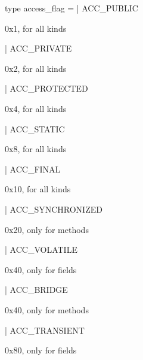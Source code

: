 \documentclass[11pt]{article}
\begin{document}
\label{type:Dex.access-underscoreflag}\begin{ocamldoccode}
type access_flag =
  | ACC_PUBLIC
\end{ocamldoccode}
\begin{ocamldoccomment}
0x1, for all kinds
\end{ocamldoccomment}
\begin{ocamldoccode}
  | ACC_PRIVATE
\end{ocamldoccode}
\begin{ocamldoccomment}
0x2, for all kinds
\end{ocamldoccomment}
\begin{ocamldoccode}
  | ACC_PROTECTED
\end{ocamldoccode}
\begin{ocamldoccomment}
0x4, for all kinds
\end{ocamldoccomment}
\begin{ocamldoccode}
  | ACC_STATIC
\end{ocamldoccode}
\begin{ocamldoccomment}
0x8, for all kinds
\end{ocamldoccomment}
\begin{ocamldoccode}
  | ACC_FINAL
\end{ocamldoccode}
\begin{ocamldoccomment}
0x10, for all kinds
\end{ocamldoccomment}
\begin{ocamldoccode}
  | ACC_SYNCHRONIZED
\end{ocamldoccode}
\begin{ocamldoccomment}
0x20, only for methods
\end{ocamldoccomment}
\begin{ocamldoccode}
  | ACC_VOLATILE
\end{ocamldoccode}
\begin{ocamldoccomment}
0x40, only for fields
\end{ocamldoccomment}
\begin{ocamldoccode}
  | ACC_BRIDGE
\end{ocamldoccode}
\begin{ocamldoccomment}
0x40, only for methods
\end{ocamldoccomment}
\begin{ocamldoccode}
  | ACC_TRANSIENT
\end{ocamldoccode}
\begin{ocamldoccomment}
0x80, only for fields
\end{ocamldoccomment}
\end{document}
